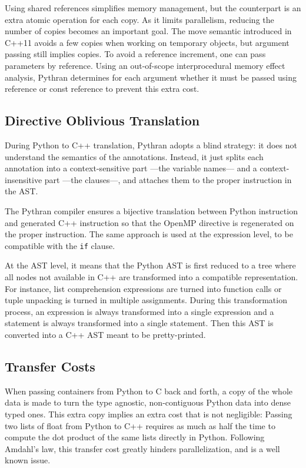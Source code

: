 \documentclass{llncs}
\begin{document}
Using shared references simplifies memory management, but the counterpart is an
extra atomic operation for each copy. As it limits parallelism, reducing the
number of copies becomes an important goal. The move semantic introduced in
C++11 avoids a few copies when working on temporary objects, but argument
passing still implies copies. To avoid a reference increment, one can pass
parameters by reference. Using an out-of-scope interprocedural memory effect
analysis, Pythran determines for each argument whether it must be passed using
reference or const reference to prevent this extra cost.

\subsection{Directive Oblivious Translation}

During Python to C++ translation, Pythran adopts a blind strategy: it does not
understand the semantics of the annotations. Instead, it just splits each
annotation into a context-sensitive part ---the variable names--- and a
context-insensitive part ---the clauses---, and attaches them to the proper
instruction in the AST.

The Pythran compiler ensures a bijective translation between Python instruction
and generated C++ instruction so that the OpenMP directive is regenerated on the
proper instruction. The same approach is used at the expression level, to be
compatible with the \texttt{if} clause.

At the AST level, it means that the Python AST is first reduced to a tree where
all nodes not available in C++ are transformed into a compatible representation.
For instance, list comprehension expressions are turned into function calls or
tuple unpacking is turned in multiple assignments. During this transformation
process, an expression is always transformed into a single expression and a
statement is always transformed into a single statement. Then this AST is
converted into a C++ AST meant to be pretty-printed.


\subsection{Transfer Costs}

When passing containers from Python to C back and forth, a copy of the whole
data is made to turn the type agnostic, non-contiguous Python data into dense
typed ones. This extra copy implies an extra cost that is not negligible:
Passing two lists of float from Python to C++ requires as much as half the time
to compute the dot product of the same lists directly in Python. Following
Amdahl's law, this transfer cost greatly hinders parallelization, and is a well
known issue.
\end{document}
